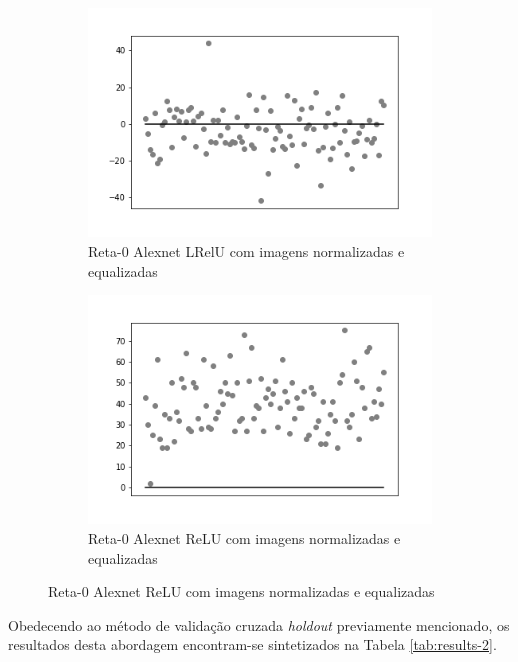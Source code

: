 \begin{figure}[hb!]
	\caption{Redes neurais biológicas.}
	\begin{subfigure}[hb]{0.5\linewidth}
		\caption{Reta-0 Alexnet LRelU com imagens normalizadas e equalizadas}
		\label{fig:histalexlrelunorm}
		\includegraphics[width=\linewidth]{img/graficos-fase2/fig-reta-0-alexnet-lrelu-data-augmentation-2-2.png}
	\end{subfigure}%
	\begin{subfigure}[hb]{0.5\linewidth}
		\caption{Reta-0 Alexnet ReLU com imagens normalizadas e equalizadas}
		\label{fig:redeneuralbiologica}
		\includegraphics[width=\linewidth]{img/graficos-fase2/fig-reta-0-alexnet-relu-data-augmentation-2-1.png}
	\end{subfigure}
\end{figure}

Obedecendo ao método de validação cruzada \emph{holdout} previamente mencionado, os resultados desta abordagem encontram-se sintetizados na Tabela \ref{tab:results-2}.

